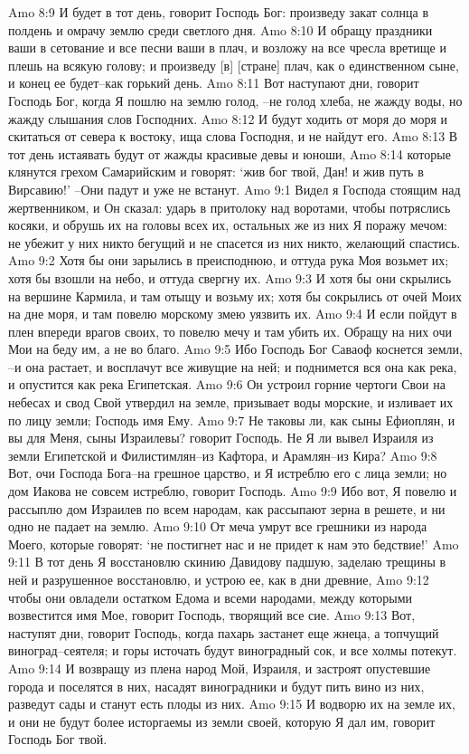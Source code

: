 Amo 8:9  И будет в тот день, говорит Господь Бог: произведу закат солнца в полдень и омрачу землю среди светлого дня.
Amo 8:10  И обращу праздники ваши в сетование и все песни ваши в плач, и возложу на все чресла вретище и плешь на всякую голову; и произведу [в] [стране] плач, как о единственном сыне, и конец ее будет--как горький день.
Amo 8:11  Вот наступают дни, говорит Господь Бог, когда Я пошлю на землю голод, --не голод хлеба, не жажду воды, но жажду слышания слов Господних.
Amo 8:12  И будут ходить от моря до моря и скитаться от севера к востоку, ища слова Господня, и не найдут его.
Amo 8:13  В тот день истаявать будут от жажды красивые девы и юноши,
Amo 8:14  которые клянутся грехом Самарийским и говорят: `жив бог твой, Дан! и жив путь в Вирсавию!' --Они падут и уже не встанут.
Amo 9:1  Видел я Господа стоящим над жертвенником, и Он сказал: ударь в притолоку над воротами, чтобы потряслись косяки, и обрушь их на головы всех их, остальных же из них Я поражу мечом: не убежит у них никто бегущий и не спасется из них никто, желающий спастись.
Amo 9:2  Хотя бы они зарылись в преисподнюю, и оттуда рука Моя возьмет их; хотя бы взошли на небо, и оттуда свергну их.
Amo 9:3  И хотя бы они скрылись на вершине Кармила, и там отыщу и возьму их; хотя бы сокрылись от очей Моих на дне моря, и там повелю морскому змею уязвить их.
Amo 9:4  И если пойдут в плен впереди врагов своих, то повелю мечу и там убить их. Обращу на них очи Мои на беду им, а не во благо.
Amo 9:5  Ибо Господь Бог Саваоф коснется земли, --и она растает, и восплачут все живущие на ней; и поднимется вся она как река, и опустится как река Египетская.
Amo 9:6  Он устроил горние чертоги Свои на небесах и свод Свой утвердил на земле, призывает воды морские, и изливает их по лицу земли; Господь имя Ему.
Amo 9:7  Не таковы ли, как сыны Ефиоплян, и вы для Меня, сыны Израилевы? говорит Господь. Не Я ли вывел Израиля из земли Египетской и Филистимлян--из Кафтора, и Арамлян--из Кира?
Amo 9:8  Вот, очи Господа Бога--на грешное царство, и Я истреблю его с лица земли; но дом Иакова не совсем истреблю, говорит Господь.
Amo 9:9  Ибо вот, Я повелю и рассыплю дом Израилев по всем народам, как рассыпают зерна в решете, и ни одно не падает на землю.
Amo 9:10  От меча умрут все грешники из народа Моего, которые говорят: `не постигнет нас и не придет к нам это бедствие!'
Amo 9:11  В тот день Я восстановлю скинию Давидову падшую, заделаю трещины в ней и разрушенное восстановлю, и устрою ее, как в дни древние,
Amo 9:12  чтобы они овладели остатком Едома и всеми народами, между которыми возвестится имя Мое, говорит Господь, творящий все сие.
Amo 9:13  Вот, наступят дни, говорит Господь, когда пахарь застанет еще жнеца, а топчущий виноград--сеятеля; и горы источать будут виноградный сок, и все холмы потекут.
Amo 9:14  И возвращу из плена народ Мой, Израиля, и застроят опустевшие города и поселятся в них, насадят виноградники и будут пить вино из них, разведут сады и станут есть плоды из них.
Amo 9:15  И водворю их на земле их, и они не будут более исторгаемы из земли своей, которую Я дал им, говорит Господь Бог твой.


